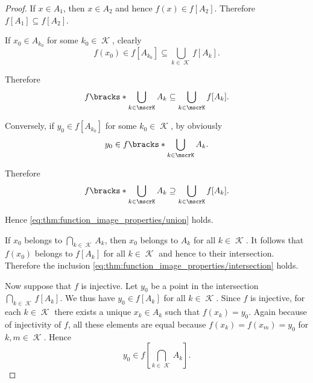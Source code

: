 \begin{proof}
   If \( x \in A_1 \), then \( x \in A_2 \) and hence \( f(x) \in f[A_2] \). Therefore \( f[A_1] \subseteq f[A_2] \).

   If \( x_0 \in A_{k_0} \) for some \( k_0 \in \mscrK \), clearly
  \begin{equation*}
    f(x_0) \in f[A_{k_0}] \subseteq \bigcup_{k \in \mscrK} f[A_k].
  \end{equation*}

  Therefore
  \begin{equation*}
    f\bracks*{ \bigcup_{k \in \mscrK} A_k } \subseteq \bigcup_{k \in \mscrK} f[A_k].
  \end{equation*}

  Conversely, if \( y_0 \in f[A_{k_0}] \) for some \( k_0 \in \mscrK \), by  obviously
  \begin{equation*}
    y_0 \in f\bracks*{ \bigcup_{k \in \mscrK} A_k }.
  \end{equation*}

  Therefore
  \begin{equation*}
    f\bracks*{ \bigcup_{k \in \mscrK} A_k } \supseteq \bigcup_{k \in \mscrK} f[A_k].
  \end{equation*}

  Hence \eqref{eq:thm:function_image_properties/union} holds.

   If \( x_0 \) belongs to \( \bigcap_{k \in \mscrK} A_k \), then \( x_0 \) belongs to \( A_k \) for all \( k \in \mscrK \). It follows that \( f(x_0) \) belongs to \( f[A_k] \) for all \( k \in \mscrK \) and hence to their intersection. Therefore the inclusion \eqref{eq:thm:function_image_properties/intersection} holds.

  Now suppose that \( f \) is injective. Let \( y_0 \) be a point in the intersection \( \bigcap_{k \in \mscrK} f[A_k] \). We thus have \( y_0 \in f[A_k] \) for all \( k \in \mscrK \). Since \( f \) is injective, for each \( k \in \mscrK \) there exists a unique \( x_k \in A_k \) such that \( f(x_k) = y_0 \). Again because of injectivity of \( f \), all these elements are equal because \( f(x_k) = f(x_m) = y_0 \) for \( k, m \in \mscrK \). Hence
  \begin{equation*}
    y_0 \in f[\bigcap_{k \in \mscrK} A_k].
  \end{equation*}


\end{proof}
